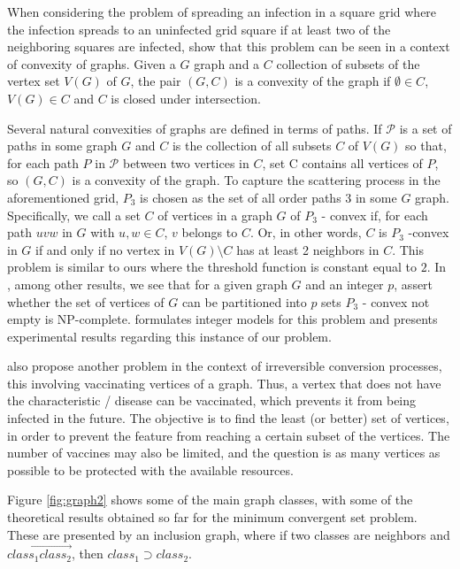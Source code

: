 When considering the problem of spreading an infection in a square grid where the infection spreads to an uninfected grid square if at least two of the neighboring squares are infected, \citeauthor{centeno2010} show that this problem can be seen in a context of convexity of graphs. Given a $ G $ graph and a $ C $ collection of subsets of the vertex set $ V (G) $ of $ G $, the pair $ (G, C) $ is a convexity of the graph if $ \emptyset \in C $, $ V (G) \in C $ and $ C $ is closed under intersection.


Several natural convexities of graphs are defined in terms of paths. If $ \mathcal{P} $ is a set of paths in some graph $ G $ and $ C $ is the collection of all subsets $ C $ of $ V (G) $ so that, for each path $ P $ in $ \mathcal{P} $ between two vertices in $ C $, set C contains all vertices of $ P $, so $ (G, C) $ is a convexity of the graph. To capture the scattering process in the aforementioned grid, $ P_3 $ is chosen as the set of all order paths 3 in some $ G $ graph. Specifically, we call a set $ C $ of vertices in a graph $ G $ of $ P_3 $ - convex if, for each path $ uvw $ in $ G $ with $ u, w \in C $, $ v $ belongs to $ C $. Or, in other words, $ C $ is $ P_3 $ -convex in $ G $ if and only if no vertex in $ V (G) \setminus C $ has at least 2 neighbors in $ C $. This problem is similar to ours where the threshold function is constant equal to $2$. In \cite{centeno2010}, among other results, we see that for a given graph $ G $ and an integer $ p $, assert whether the set of vertices of $ G $ can be partitioned into $ p $ sets $ P_3 $ - convex not empty is NP-complete. \cite{lacerda2017} formulates integer models for this problem and presents experimental results regarding this instance of our problem.

\citeauthor{dreyer2009} also propose another problem in the context of irreversible conversion processes, this involving vaccinating vertices of a graph. Thus, a vertex that does not have the characteristic / disease can be vaccinated, which prevents it from being infected in the future. The objective is to find the least (or better) set of vertices, in order to prevent the feature from reaching a certain subset of the vertices. The number of vaccines may also be limited, and the question is as many vertices as possible to be protected with the available resources.

Figure \ref{fig:graph2} 
shows some of the main graph classes, with some of the theoretical results obtained so far for the minimum convergent set problem. These are presented by an inclusion graph, where if two classes are neighbors and $\overrightarrow{class_1 class_2}$, then $class_1 \supset class_2$.

